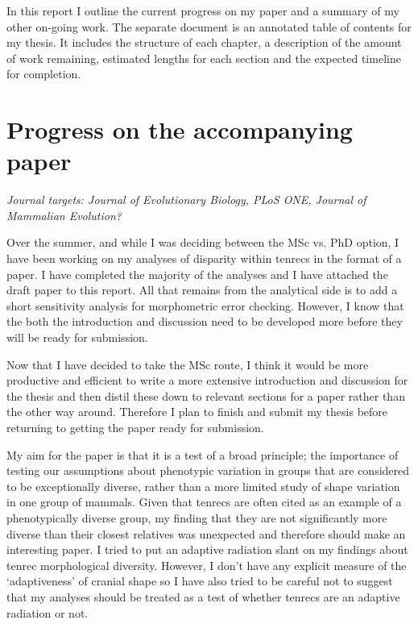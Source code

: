\documentclass[12pt,a4paper]{article}
\begin{document}
	In this report I outline the current progress on my paper and a summary of my other on-going work. The separate document is an annotated table of contents for my thesis. It includes the structure of each chapter, a description of the amount of work remaining, estimated lengths for each section and the expected timeline for completion.  


\section{Progress on the accompanying paper}

	\textit{Journal targets: Journal of Evolutionary Biology, PLoS ONE, Journal of Mammalian Evolution?} 
\bigskip

	Over the summer, and while I was deciding between the MSc vs. PhD option, I have been working on my analyses of disparity within tenrecs in the format of a paper. I have completed the majority of the analyses and I have attached the draft paper to this report. All that remains from the analytical side is to add a short sensitivity analysis for morphometric error checking.  However, I know that the both the introduction and discussion need to be developed more before they will be ready for submission.
	
	Now that I have decided to take the MSc route, I think it would be more productive and efficient to write a more extensive introduction and discussion for the thesis and then distil these down to relevant sections for a paper rather than the other way around. Therefore I plan to finish and submit my thesis before returning to getting the paper ready for submission. 

	My aim for the paper is that it is a test of a broad principle; the importance of testing our assumptions about phenotypic variation in groups that are considered to be exceptionally diverse, rather than a more limited study of shape variation in one group of mammals. Given that tenrecs are often cited as an example of a phenotypically diverse group, my finding that they are not significantly more diverse than their closest relatives was unexpected and therefore should make an interesting paper. I tried to put an adaptive radiation slant on my findings about tenrec morphological diversity. However, I don't have any explicit measure of the `adaptiveness' of cranial shape so I have also tried to be careful not to suggest that my analyses should be treated as a test of whether tenrecs are an adaptive radiation or not.
	
\end{document}
